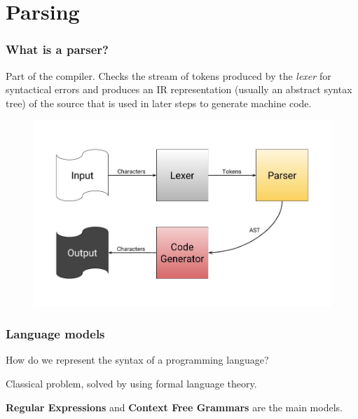 \section{Parsing}
\begin{frame}
	\frametitle{What is a parser?}
    \begin{block}{}
        
        Part of the compiler.
        Checks the stream of tokens produced by the \emph{lexer} for syntactical errors
        and produces an IR representation (usually an abstract syntax tree) of the source 
        that is used in later steps to generate machine code.
    \end{block}
    \begin{figure}
        \includegraphics[width=\textwidth,height=.6\textheight]{img/parser.jpg}
    \end{figure}
\end{frame}
\begin{frame}
    \frametitle{Language models}
    
    \begin{block}{}How do we represent the syntax of a programming language?\end{block}

    \begin{block}{}Classical problem, solved by using formal language theory.\end{block}


    \begin{block}{}{\textbf{Regular Expressions} and \textbf{Context Free Grammars } are the main models.}\end{block}

\end{frame}
